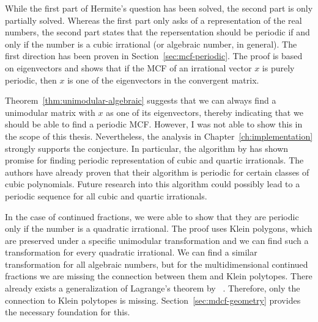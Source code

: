 While the first part of Hermite's question has been solved,
the second part is only partially solved.
Whereas the first part only asks of a representation of the real numbers,
the second part states that the repersentation should be periodic if and only
if the number is a cubic irrational (or algebraic number, in general).
The first direction has been proven in Section~\ref{sec:mcf-periodic}.
The proof is based on eigenvectors and shows that if the MCF of an irrational vector $x$ is
purely periodic, then $x$ is one of the eigenvectors in the convergent matrix.

Theorem~\ref{thm:unimodular-algebraic} suggests that we can always find a
unimodular matrix with $x$ as one of its eigenvectors,
thereby indicating that we should be able to find a periodic MCF.
However, I was not able to show this in the scope of this thesis.
Nevertheless, the analysis in Chapter~\ref{ch:implementation}
strongly supports the conjecture.
In particular, the algorithm by \citeauthor{Tamura09} has shown promise for
finding periodic representation of cubic and quartic irrationals.
The authors have already proven that their algorithm is periodic for certain
classes of cubic polynomials.
Future research into this algorithm could possibly lead to a periodic sequence
for all cubic and quartic irrationals.

In the case of continued fractions,
we were able to show that they are periodic only if the number is a quadratic irrational.
The proof uses Klein polygons, which are preserved under a specific unimodular transformation
and we can find such a transformation for every quadratic irrational.
We can find a similar transformation for all algebraic numbers, but for the
multidimensional continued fractions we are missing the connection between them
and Klein polytopes.
There already exists a generalization of Lagrange's theorem by \citeauthor{German08}~\cite{German08}.
Therefore, only the connection to Klein polytopes is missing.
Section~\ref{sec:mdcf-geometry} provides the necessary foundation for this.


